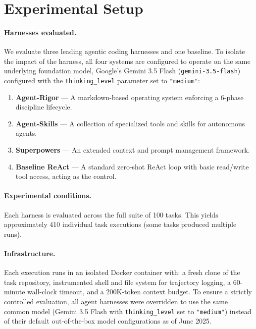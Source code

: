 \documentclass[letterpaper, 10 pt, conference]{ieeeconf}
\begin{document}
\section{Experimental Setup}
\label{sec:experimental}

\paragraph{Harnesses evaluated.}
We evaluate three leading agentic coding harnesses and one baseline. To isolate the impact of the harness, all four systems are configured to operate on the same underlying foundation model, Google's Gemini 3.5 Flash (\texttt{gemini-3.5-flash}) configured with the \texttt{thinking\_level} parameter set to \texttt{"medium"}:
\begin{enumerate}[leftmargin=*,itemsep=1pt]
  \item \textbf{Agent-Rigor} --- A markdown-based operating system enforcing a 6-phase discipline lifecycle.
  \item \textbf{Agent-Skills} --- A collection of specialized tools and skills for autonomous agents.
  \item \textbf{Superpowers} --- An extended context and prompt management framework.
  \item \textbf{Baseline ReAct} --- A standard zero-shot ReAct loop with basic read/write tool access, acting as the control.
\end{enumerate}

\paragraph{Experimental conditions.}
Each harness is evaluated across the full suite of 100 tasks. This yields approximately 410 individual task executions (some tasks produced multiple runs).


\paragraph{Infrastructure.}
Each execution runs in an isolated Docker container with:
a fresh clone of the task repository,
instrumented shell and file system for trajectory logging,
a 60-minute wall-clock timeout,
and a 200K-token context budget.
To ensure a strictly controlled evaluation, all agent harnesses were overridden to use the same common model (Gemini 3.5 Flash with \texttt{thinking\_level} set to \texttt{"medium"}) instead of their default out-of-the-box model configurations as of June 2025.
\end{document}
